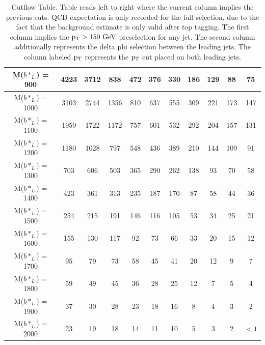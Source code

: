 \begin{table}
\begin{center}
\begin{small}
\begin{tabular}{|c||c|c|c|c|c|c|c|c|c|c|}
\hline
M($b*_{L}$) = 900 & 4223 & 3712 & 838 & 472 & 376 & 330 & 186 & 129 & 88 & 75\\ 
\hline
M($b*_{L}$) = 1000 & 3103 & 2744 & 1356 & 810 & 637 & 555 & 309 & 221 & 173 & 147\\ 
\hline
M($b*_{L}$) = 1100 & 1959 & 1722 & 1172 & 757 & 601 & 532 & 292 & 204 & 157 & 131\\ 
\hline
M($b*_{L}$) = 1200 & 1180 & 1028 & 797 & 548 & 436 & 389 & 210 & 144 & 109 & 91\\ 
\hline
M($b*_{L}$) = 1300 & 703 & 606 & 503 & 365 & 290 & 262 & 138 & 93 & 70 & 58\\ 
\hline
M($b*_{L}$) = 1400 & 423 & 361 & 313 & 235 & 187 & 170 & 87 & 58 & 44 & 36\\ 
\hline
M($b*_{L}$) = 1500 & 254 & 215 & 191 & 146 & 116 & 105 & 53 & 34 & 25 & 21\\ 
\hline
M($b*_{L}$) = 1600 & 155 & 130 & 117 & 92 & 73 & 66 & 33 & 20 & 15 & 12\\ 
\hline
M($b*_{L}$) = 1700 & 95 & 79 & 73 & 58 & 45 & 41 & 20 & 12 & 9 & 7\\ 
\hline
M($b*_{L}$) = 1800 & 59 & 49 & 45 & 36 & 28 & 25 & 12 & 7 & 5 & 4\\ 
\hline
M($b*_{L}$) = 1900 & 37 & 30 & 28 & 23 & 18 & 16 & 8 & 4 & 3 & 2\\ 
\hline
M($b*_{L}$) = 2000 & 23 & 19 & 18 & 14 & 11 & 10 & 5 & 3 & 2 & $<1$\\ 
\hline

\end{tabular}
\caption{Cutflow Table.  Table reads left to right where the current column implies the previous cuts.  QCD expectation is only recorded for the full selection, 
due to the fact that the background estimate is only valid after top tagging.  The first column implies the $\mathrm{p_{T}}>150~\mathrm{GeV}$ preselection for any jet.  The second column additionally represents the delta phi selection between the leading jets.  
The column labeled $\mathrm{p_{T}}$ represents the $\mathrm{p_{T}}$ cut placed on both leading jets.}
\label{table:bsCutflow}
\end{small}
\end{center}
\end{table}


